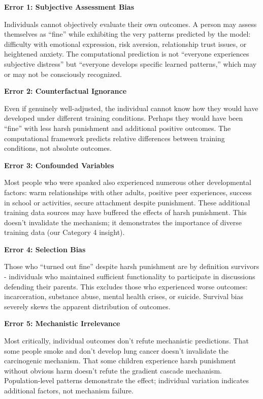 \documentclass{article}
\begin{document}
\textbf{Error 1: Subjective Assessment Bias}

Individuals cannot objectively evaluate their own outcomes. A person may assess themselves as ``fine'' while exhibiting the very patterns predicted by the model: difficulty with emotional expression, risk aversion, relationship trust issues, or heightened anxiety. The computational prediction is not ``everyone experiences subjective distress'' but ``everyone develops specific learned patterns,'' which may or may not be consciously recognized.

\textbf{Error 2: Counterfactual Ignorance}

Even if genuinely well-adjusted, the individual cannot know how they would have developed under different training conditions. Perhaps they would have been ``fine'' with less harsh punishment and additional positive outcomes. The computational framework predicts relative differences between training conditions, not absolute outcomes.

\textbf{Error 3: Confounded Variables}

Most people who were spanked also experienced numerous other developmental factors: warm relationships with other adults, positive peer experiences, success in school or activities, secure attachment despite punishment. These additional training data sources may have buffered the effects of harsh punishment. This doesn't invalidate the mechanism; it demonstrates the importance of diverse training data (our Category 4 insight).

\textbf{Error 4: Selection Bias}

Those who ``turned out fine'' despite harsh punishment are by definition survivors - individuals who maintained sufficient functionality to participate in discussions defending their parents. This excludes those who experienced worse outcomes: incarceration, substance abuse, mental health crises, or suicide. Survival bias severely skews the apparent distribution of outcomes.

\textbf{Error 5: Mechanistic Irrelevance}

Most critically, individual outcomes don't refute mechanistic predictions. That some people smoke and don't develop lung cancer doesn't invalidate the carcinogenic mechanism. That some children experience harsh punishment without obvious harm doesn't refute the gradient cascade mechanism. Population-level patterns demonstrate the effect; individual variation indicates additional factors, not mechanism failure.
\end{document}
